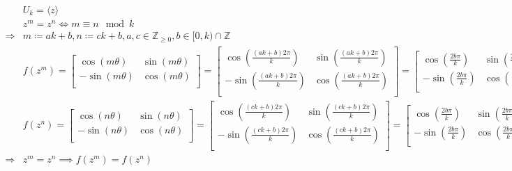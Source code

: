 \documentclass{article}
\begin{document}
\begin{equation*}
    \begin{split}
        &U_k=\langle z\rangle\\
        &z^m=z^n \Leftrightarrow m\equiv n\mod k\\
        \Rightarrow&m\coloneqq ak+b,n\coloneqq ck+b,a,c\in\mathbb{Z} _{\geqslant 0},b\in[0,k)\cap\mathbb{Z}\\
        &f(z^m)=\begin{bmatrix}
            \cos(m\theta)&\sin(m\theta)\\
            -\sin(m\theta)&\cos(m\theta)\\
        \end{bmatrix}=\begin{bmatrix}
            \cos(\frac{(ak+b)2\pi}{k})&\sin(\frac{(ak+b)2\pi}{k})\\
            -\sin(\frac{(ak+b)2\pi}{k})&\cos(\frac{(ak+b)2\pi}{k})\\
        \end{bmatrix}=\begin{bmatrix}
            \cos(\frac{2b\pi}{k})&\sin(\frac{2b\pi}{k})\\
            -\sin(\frac{2b\pi}{k})&\cos(\frac{2b\pi}{k})\\
        \end{bmatrix}\\
        &f(z^n)=\begin{bmatrix}
            \cos(n\theta)&\sin(n\theta)\\
            -\sin(n\theta)&\cos(n\theta)\\
        \end{bmatrix}=\begin{bmatrix}
            \cos(\frac{(ck+b)2\pi}{k})&\sin(\frac{(ck+b)2\pi}{k})\\
            -\sin(\frac{(ck+b)2\pi}{k})&\cos(\frac{(ck+b)2\pi}{k})\\
        \end{bmatrix}=\begin{bmatrix}
            \cos(\frac{2b\pi}{k})&\sin(\frac{2b\pi}{k})\\
            -\sin(\frac{2b\pi}{k})&\cos(\frac{2b\pi}{k})\\
        \end{bmatrix}\\
        \Rightarrow&z^m=z^n\implies f(z^m)=f(z^n)\\
    \end{split}
\end{equation*}
\end{document}
